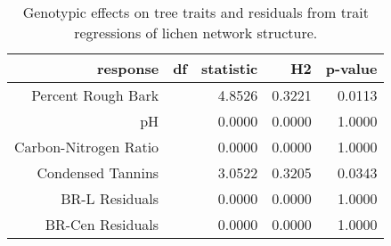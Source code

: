\begin{table}[ht]
\centering
\begin{tabular}{rrrrr}
  \hline
response & df & statistic & H2 & p-value \\ 
  \hline
Percent Rough Bark &  & 4.8526 & 0.3221 & 0.0113 \\ 
  pH &  & 0.0000 & 0.0000 & 1.0000 \\ 
  Carbon-Nitrogen Ratio &  & 0.0000 & 0.0000 & 1.0000 \\ 
  Condensed Tannins &  & 3.0522 & 0.3205 & 0.0343 \\ 
  BR-L Residuals &  & 0.0000 & 0.0000 & 1.0000 \\ 
  BR-Cen Residuals &  & 0.0000 & 0.0000 & 1.0000 \\ 
   \hline
\end{tabular}
\caption{Genotypic effects on tree traits and residuals from trait regressions of lichen network structure.} 
\label{tab:h2_trait}
\end{table}
